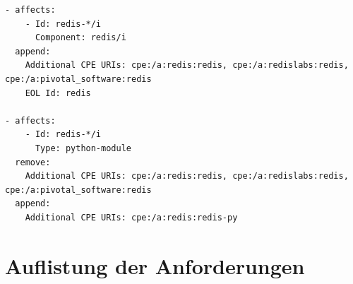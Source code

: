 

\begin{lstlisting}[style=yaml,caption={Korrelationseinträge zwei unterschiedlicher Dateien die aufeinander aufbauen},label={lst:correlation-order-depdendency-example}]
- affects:
    - Id: redis-*/i
      Component: redis/i
  append:
    Additional CPE URIs: cpe:/a:redis:redis, cpe:/a:redislabs:redis, cpe:/a:pivotal_software:redis
    EOL Id: redis

- affects:
    - Id: redis-*/i
      Type: python-module
  remove:
    Additional CPE URIs: cpe:/a:redis:redis, cpe:/a:redislabs:redis, cpe:/a:pivotal_software:redis
  append:
    Additional CPE URIs: cpe:/a:redis:redis-py
\end{lstlisting}


\section{Auflistung der Anforderungen}

